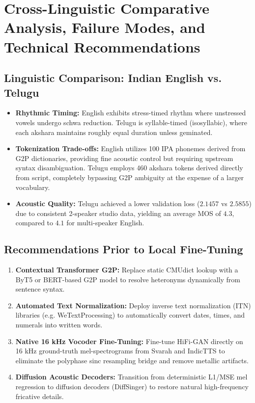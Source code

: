 \documentclass[11pt,a4paper]{article}
\begin{document}
\section{Cross-Linguistic Comparative Analysis, Failure Modes, and Technical Recommendations}

\subsection{Linguistic Comparison: Indian English vs. Telugu}
\begin{itemize}
    \item \textbf{Rhythmic Timing:} English exhibits stress-timed rhythm where unstressed vowels undergo schwa reduction. Telugu is syllable-timed (isosyllabic), where each akshara maintains roughly equal duration unless geminated.
    \item \textbf{Tokenization Trade-offs:} English utilizes 100 IPA phonemes derived from G2P dictionaries, providing fine acoustic control but requiring upstream syntax disambiguation. Telugu employs 460 akshara tokens derived directly from script, completely bypassing G2P ambiguity at the expense of a larger vocabulary.
    \item \textbf{Acoustic Quality:} Telugu achieved a lower validation loss ($2.1457$ vs $2.5855$) due to consistent 2-speaker studio data, yielding an average MOS of $4.3$, compared to $4.1$ for multi-speaker English.
\end{itemize}

\subsection{Recommendations Prior to Local Fine-Tuning}
\begin{enumerate}
    \item \textbf{Contextual Transformer G2P:} Replace static CMUdict lookup with a ByT5 or BERT-based G2P model to resolve heteronyms dynamically from sentence syntax.
    \item \textbf{Automated Text Normalization:} Deploy inverse text normalization (ITN) libraries (e.g. WeTextProcessing) to automatically convert dates, times, and numerals into written words.
    \item \textbf{Native 16 kHz Vocoder Fine-Tuning:} Fine-tune HiFi-GAN directly on 16 kHz ground-truth mel-spectrograms from Svarah and IndicTTS to eliminate the polyphase sinc resampling bridge and remove metallic artifacts.
    \item \textbf{Diffusion Acoustic Decoders:} Transition from deterministic L1/MSE mel regression to diffusion decoders (DiffSinger) to restore natural high-frequency fricative details.
\end{enumerate}
\end{document}
